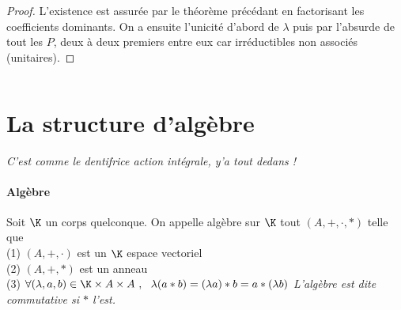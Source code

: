 		${}$ \\ 
		\begin{proof}
		L'existence est assurée par le théorème précédant en factorisant les coefficients dominants.
		On a ensuite l'unicité d'abord de $\lambda$ puis par l'absurde de tout les $P$, deux à deux premiers entre eux car irréductibles non associés (unitaires).
		\end{proof}
		${}$ \\ 
	\section{La structure d'algèbre}
		\begin{center}
		\textit{{\scriptsize C'est comme le dentifrice action intégrale, y'a tout dedans !}}
		\end{center} \traitd
		\paragraph{Algèbre}
			Soit $\K$ un corps quelconque. 
			On appelle algèbre sur $\K$ tout $(A,+,\cdot ,\ast)$ telle que\\
			\hspace*{2cm} {\scriptsize (1)} $(A,+,\cdot)$ est un $\K$ espace vectoriel\\
			\hspace*{2cm} {\scriptsize (2)}	$(A,+,\ast)$ est un anneau\\
			\hspace*{2cm} {\scriptsize (3)} $\forall (\lambda ,a,b) \in\K\times A\times A~, ~~\lambda (a\ast b)  = (\lambda a)\ast b = a\ast (\lambda b)$ \trait
		\textit{L'algèbre est dite commutative si $\ast$ l'est.} \\
		\vspace*{0.5cm} \\  \\ \traitd
